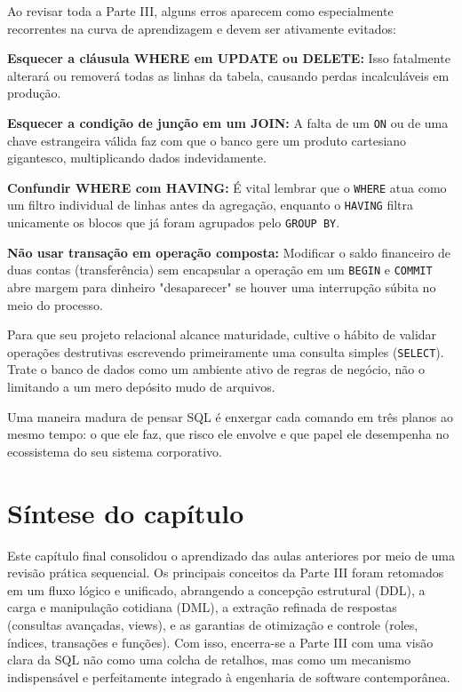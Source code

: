 Ao revisar toda a Parte III, alguns erros aparecem como especialmente recorrentes na curva de aprendizagem e devem ser ativamente evitados:

\textbf{Esquecer a cláusula WHERE em UPDATE ou DELETE:} Isso fatalmente alterará ou removerá todas as linhas da tabela, causando perdas incalculáveis em produção. 

\textbf{Esquecer a condição de junção em um JOIN:} A falta de um \texttt{ON} ou de uma chave estrangeira válida faz com que o banco gere um produto cartesiano gigantesco, multiplicando dados indevidamente.

\textbf{Confundir WHERE com HAVING:} É vital lembrar que o \texttt{WHERE} atua como um filtro individual de linhas antes da agregação, enquanto o \texttt{HAVING} filtra unicamente os blocos que já foram agrupados pelo \texttt{GROUP BY}.

\textbf{Não usar transação em operação composta:} Modificar o saldo financeiro de duas contas (transferência) sem encapsular a operação em um \texttt{BEGIN} e \texttt{COMMIT} abre margem para dinheiro "desaparecer" se houver uma interrupção súbita no meio do processo.

Para que seu projeto relacional alcance maturidade, cultive o hábito de validar operações destrutivas escrevendo primeiramente uma consulta simples (\texttt{SELECT}). Trate o banco de dados como um ambiente ativo de regras de negócio, não o limitando a um mero depósito mudo de arquivos. 

\begin{quadro_dica}
Uma maneira madura de pensar SQL é enxergar cada comando em três planos ao mesmo tempo: o que ele faz, que risco ele envolve e que papel ele desempenha no ecossistema do seu sistema corporativo.
\end{quadro_dica}

\section{Síntese do capítulo}

Este capítulo final consolidou o aprendizado das aulas anteriores por meio de uma revisão prática sequencial. Os principais conceitos da Parte III foram retomados em um fluxo lógico e unificado, abrangendo a concepção estrutural (DDL), a carga e manipulação cotidiana (DML), a extração refinada de respostas (consultas avançadas, views), e as garantias de otimização e controle (roles, índices, transações e funções). Com isso, encerra-se a Parte III com uma visão clara da SQL não como uma colcha de retalhos, mas como um mecanismo indispensável e perfeitamente integrado à engenharia de software contemporânea.